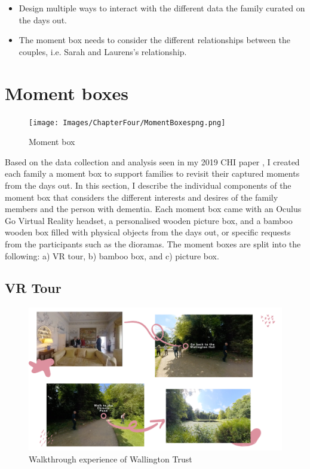 \begin{itemize}
    \item Design multiple ways to interact with the different data the family curated on the days out.
    \item The moment box needs to consider the different relationships between the couples, i.e. Sarah and Laurens's relationship.
\end{itemize}


\section{Moment boxes}
\label{MomentBoxes}

\begin{figure}[htp]
\centering
\texttt{[image: Images/ChapterFour/MomentBoxespng.png]}
\caption{Moment box}
\label{fig:MomentBoxes}
\end{figure}

Based on the data collection and analysis seen in my 2019 CHI paper \citep{hodge_exploring_2019}, I created each family a moment box to support families to revisit their captured moments from the days out. In this section, I describe the individual components of the moment box that considers the different interests and desires of the family members and the person with dementia. Each moment box came with an Oculus Go Virtual Reality headset, a personalised wooden picture box, and a bamboo wooden box filled with physical objects from the days out, or specific requests from the participants such as the dioramas. The moment boxes are split into the following: a) VR tour, b) bamboo box, and c) picture box.

\subsection{VR Tour}
\label{VRTour}

\begin{figure}[htp]
\centering
\includegraphics[width=.8\linewidth]{Images/ChapterFour/WalktrhoughOfWallington.png}
\caption{Walkthrough experience of Wallington Trust}
\label{fig:wallingtonTrust}
\end{figure}

